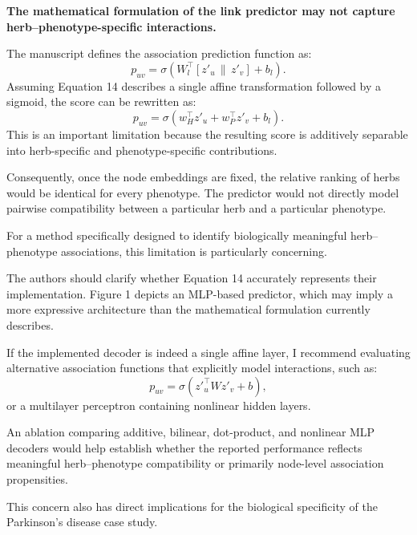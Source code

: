 \documentclass[11pt,american]{article}
\begin{document}
\begin{revresponse}

\end{revresponse}

\begin{revcomment}
\textbf{The mathematical formulation of the link predictor may not capture herb--phenotype-specific interactions.}

The manuscript defines the association prediction function as:
\[ p_{uv} = \sigma\left( W_l^\top [z'_u \,\|\, z'_v] + b_l \right). \]
Assuming Equation 14 describes a single affine transformation followed by a sigmoid, the score can be rewritten as:
\[ p_{uv} = \sigma\left( w_H^\top z'_u + w_P^\top z'_v + b_l \right). \]
This is an important limitation because the resulting score is additively separable into herb-specific and phenotype-specific contributions.

Consequently, once the node embeddings are fixed, the relative ranking of herbs would be identical for every phenotype. The predictor would not directly model pairwise compatibility between a particular herb and a particular phenotype.

For a method specifically designed to identify biologically meaningful herb--phenotype associations, this limitation is particularly concerning.

The authors should clarify whether Equation 14 accurately represents their implementation. Figure 1 depicts an MLP-based predictor, which may imply a more expressive architecture than the mathematical formulation currently describes.

If the implemented decoder is indeed a single affine layer, I recommend evaluating alternative association functions that explicitly model interactions, such as:
\[ p_{uv} = \sigma\left( z'^{\top}_u W z'_v + b \right), \]
or a multilayer perceptron containing nonlinear hidden layers.

An ablation comparing additive, bilinear, dot-product, and nonlinear MLP decoders would help establish whether the reported performance reflects meaningful herb--phenotype compatibility or primarily node-level association propensities.

This concern also has direct implications for the biological specificity of the Parkinson's disease case study.
\end{revcomment}

\begin{revresponse}

\end{revresponse}
\end{document}
